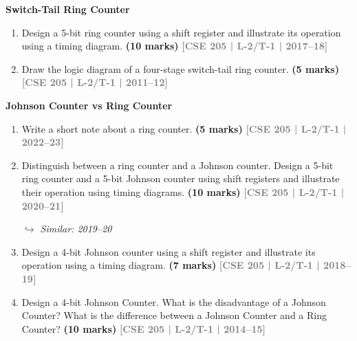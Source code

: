 \documentclass[12pt,a3paper]{article}
\newcommand{\yr}[1]{\hfill\textcolor{gray}{\small\textbf{[#1]}}}
\newcommand{\mk}[1]{\textcolor{orange!70!black}{\small\textbf{(#1 marks)}}}
\newcommand{\variant}[1]{\par\vspace{1pt}\textcolor{blue!50!black}%
  {\footnotesize\textit{$\hookrightarrow$ Similar: #1}}}
\newcommand{\subtopic}[2]{%
  \vspace{10pt}
  \noindent\begin{tcolorbox}[colback=#1!8,colframe=#1,boxrule=0.6pt,arc=4pt,
    left=6pt,right=6pt,top=4pt,bottom=4pt]
    \small\bfseries\textcolor{#1}{#2}
  \end{tcolorbox}
  \vspace{2pt}
}
\begin{document}
\subtopic{cG}{Switch-Tail Ring Counter}
\label{sub:s7-ring}

\begin{enumerate}

\item Design a 5-bit ring counter using a shift register and illustrate its operation using a timing diagram.
\mk{10} \yr{CSE 205 | L-2/T-1 | 2017--18}

\item Draw the logic diagram of a four-stage switch-tail ring counter.
\mk{5} \yr{CSE 205 | L-2/T-1 | 2011--12}


\end{enumerate}

\subtopic{cG}{Johnson Counter vs Ring Counter}
\label{sub:s7-johnson}

\begin{enumerate}

\item Write a short note about a ring counter.
\mk{5} \yr{CSE 205 | L-2/T-1 | 2022--23}

\item Distinguish between a ring counter and a Johnson counter. Design a 5-bit ring counter and a 5-bit Johnson counter using shift registers and illustrate their operation using timing diagrams.
\mk{10} \yr{CSE 205 | L-2/T-1 | 2020--21}
\variant{2019--20}

\item Design a 4-bit Johnson counter using a shift register and illustrate its operation using a timing diagram.
\mk{7} \yr{CSE 205 | L-2/T-1 | 2018--19}


\item Design a 4-bit Johnson Counter. What is the disadvantage of a Johnson Counter? What is the difference between a Johnson Counter and a Ring Counter?
\mk{10} \yr{CSE 205 | L-2/T-1 | 2014--15}


\end{enumerate}
\end{document}

